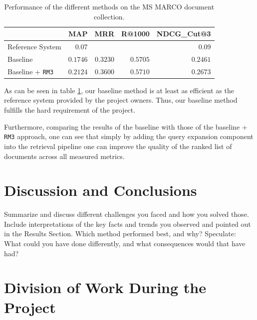 \documentclass[sigconf]{acmart}
\begin{document}
\begin{table}[h]
\begin{center}
	\caption{Performance of the different methods on the MS MARCO document collection.}
	\begin{tabular}{l|rrrr}
			& MAP & MRR & R@1000 & NDCG\_Cut@3 \\
		\hline
		Reference System & 0.07 &  &  & 0.09 \\
		Baseline & $0.1746$ & $0.3230$ & $0.5705$ & $0.2461$ \\
		Baseline + \texttt{RM3} & $\mathbf{0.2124}$ & $\mathbf{0.3600}$ & $\mathbf{0.5710}$ & $\mathbf{0.2673}$
	\end{tabular}
	\label{table:1}
\end{center}
\end{table}

As can be seen in table \ref{table:1}, our baseline method is at least as efficient as the reference system provided by the project owners. Thus, our baseline method fulfills the hard requirement of the project.

Furthermore, comparing the results of the baseline with those of the baseline + \texttt{RM3} approach, one can see that simply by adding the query expansion component into the retrieval pipeline one can improve the quality of the ranked list of documents across all measured metrics.

\section{Discussion and Conclusions}

Summarize and discuss different challenges you faced and how you solved those. Include interpretations of the key facts and trends you observed and pointed out in the Results Section. Which method performed best, and why? Speculate: What could you have done differently, and what consequences would that have had?







\newpage
\appendix
\section{Division of Work During the Project}
\end{document}
